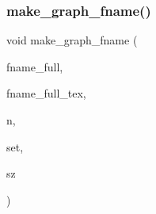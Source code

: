 \subsubsection{\texorpdfstring{make\+\_\+graph\+\_\+fname()}{make\_graph\_fname()}}
{\footnotesize\ttfamily void make\+\_\+graph\+\_\+fname (\begin{DoxyParamCaption}\item[{\mbox{\hyperlink{galois_8h_ab6cc7b4aeb6ea31aba2b3fbfc83ff5e6}{B\+Y\+TE}} $\ast$}]{fname\+\_\+full,  }\item[{\mbox{\hyperlink{galois_8h_ab6cc7b4aeb6ea31aba2b3fbfc83ff5e6}{B\+Y\+TE}} $\ast$}]{fname\+\_\+full\+\_\+tex,  }\item[{\mbox{\hyperlink{galois_8h_a09fddde158a3a20bd2dcadb609de11dc}{I\+NT}}}]{n,  }\item[{\mbox{\hyperlink{galois_8h_a09fddde158a3a20bd2dcadb609de11dc}{I\+NT}} $\ast$}]{set,  }\item[{\mbox{\hyperlink{galois_8h_a09fddde158a3a20bd2dcadb609de11dc}{I\+NT}}}]{sz }\end{DoxyParamCaption})}

